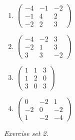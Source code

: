\begin{enumerate}[label=\arabic*., leftmargin=*, itemsep=1pt]
\item $\left(\begin{smallmatrix}-4 & -1 & -2\\ -1 & 4 & 2\\ -2 & 2 & 3\end{smallmatrix}\right)$
\item $\left(\begin{smallmatrix}-4 & -2 & 3\\ -2 & 1 & 3\\ 3 & 3 & -2\end{smallmatrix}\right)$
\item $\left(\begin{smallmatrix}1 & 1 & 3\\ 1 & 2 & 0\\ 3 & 0 & 3\end{smallmatrix}\right)$
\item $\left(\begin{smallmatrix}0 & -2 & 1\\ -2 & 0 & -2\\ 1 & -2 & -4\end{smallmatrix}\right)$
\end{enumerate}
\par\noindent\emph{Exercise set 2.}\nopagebreak
